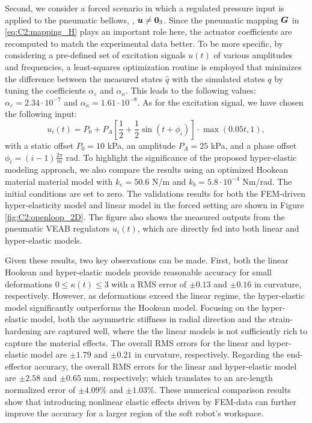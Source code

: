 Second, we consider a forced scenario in which a regulated pressure input is applied to the pneumatic bellows, \ie, ${\boldsymbol{u}} \neq \boldsymbol{0}_3$. Since the pneumatic mapping $\boldsymbol{G}$ in \eqref{eq:C2:mapping_H} plays an important role here, the actuator coefficients are recomputed to match the experimental data better. To be more specific, by considering a pre-defined set of excitation signals $u(t)$ of various amplitudes and frequencies, a least-squares optimization routine is employed that minimizes the difference between the measured states $\hat{q}$ with the simulated states ${q}$ by tuning the coefficients $\alpha_\varepsilon$ and $\alpha_\kappa$. This leads to the following values: $\alpha_\varepsilon = 2.34\cdot 10^{-7}$ and $\alpha_\kappa =  1.61\cdot 10^{-8}$. As for the excitation signal, we have chosen the following input:
%
\begin{equation}
u_i(t) = P_0 + P_A \left[\frac{1}{2} + \frac{1}{2}\sin(t + \phi_i) \right]\cdot \max(0.05t,1),
\end{equation}
%
with a static offset $P_0 = 10$ kPa, an amplitude $P_A = 25$ kPa, and a phase offset $\phi_i = (i-1)\frac{2\pi}{m}$ rad. To highlight the significance of the proposed hyper-elastic modeling approach, we also compare the results using an optimized Hookean material material model with $k_e = 50.6$ N/m and $k_b = 5.8\cdot 10^{-4}$ Nm/rad. The initial conditions are set to zero. The validations results for both the FEM-driven hyper-elasticity model and linear model in the forced setting are shown in Figure \ref{fig:C2:openloop_2D}. The figure also shows the measured outputs from the pneumatic VEAB regulators $u_i(t)$, which are directly fed into both linear and hyper-elastic models. 

Given these results, two key observations can be made. First, both the linear Hookean and hyper-elastic models provide reasonable accuracy for small deformations $0 \le \kappa(t) \le 3$ with a RMS error of $\pm0.13$ and $\pm0.16$ in curvature, respectively. However, as deformations exceed the linear regime, the hyper-elastic model significantly outperforms the Hookean model. Focusing on the hyper-elastic model, both the asymmetric stiffness in radial direction and the strain-hardening are captured well, where the the linear models is not sufficiently rich to capture the material effects. The overall RMS errors for the linear and hyper-elastic model are $\pm1.79$ and $\pm0.21$ in curvature, respectively. Regarding the end-effector accuracy, the overall RMS errors for the linear and hyper-elastic model are $\pm2.58$ and $\pm0.65$ mm, respectively; which translates to an arc-length normalized error of $\pm4.09\%$ and $\pm1.03\%$. These  numerical comparison  results show that introducing nonlinear elastic effects driven by FEM-data can further improve the accuracy for a larger region of the soft robot's workspace.

